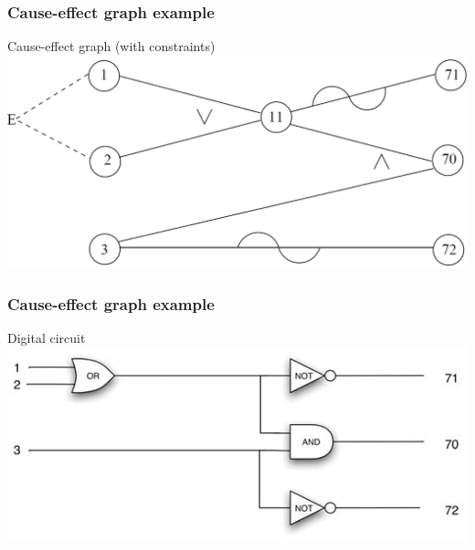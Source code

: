 \begin{frame}
\frametitle{Cause-effect graph example}

\begin{block}{Cause-effect graph (with constraints)}
\includegraphics[width=\textwidth]{aux/examples/cause-effect-graph/Cause-effect graph example (with constraints)}
\end{block}
\end{frame}



\begin{frame}[hasprev=true, hasnext=false]
\frametitle{Cause-effect graph example}

\begin{block}{Digital circuit}
\includegraphics[width=\textwidth]{aux/examples/cause-effect-graph/Cause-effect graph to digital circuit example}
\end{block}

\end{frame}